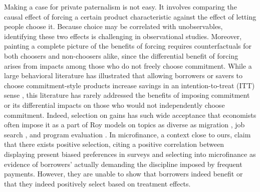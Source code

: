 \documentclass[oneside,11pt]{article}
\begin{document}
Making a case for private paternalism is not easy. It involves comparing the causal effect of forcing a certain product characteristic against the effect of letting people choose it. Because choice may be correlated with unobservables, identifying these two effects is challenging in observational studies.  %
Moreover, painting a complete picture of the benefits of forcing requires counterfactuals for both choosers and non-choosers alike, since the differential benefit of forcing arises from impacts among those who do not freely choose commitment. While a large behavioral literature has illustrated that allowing borrowers or savers to choose commitment-style products increase savings in an intention-to-treat (ITT) sense \citep{thaler2004save, prina2015banking, brune2016facilitating, callen2019headwaters, Pascaline, Ashraf}, this literature has rarely addressed the benefits of imposing commitment or its differential impacts on those who would not independently choose commitment.  
Indeed, selection on gains has such wide acceptance that economists often impose it as a part of Roy models on topics as diverse as migration \citep{borjas1989economic}, job search \citep{lippman1976economics}, and program evaluation \citep{bjorklund1987estimation}. In microfinance, a context close to ours, \citep{Murdoch} claim that there exists positive selection, citing a positive correlation between displaying present biased preferences in surveys and selecting into microfinance as evidence of borrowers' actually demanding the discipline imposed by frequent payments. However, they are unable to show that borrowers indeed benefit or that they indeed positively select based on treatment effects.
\end{document}
